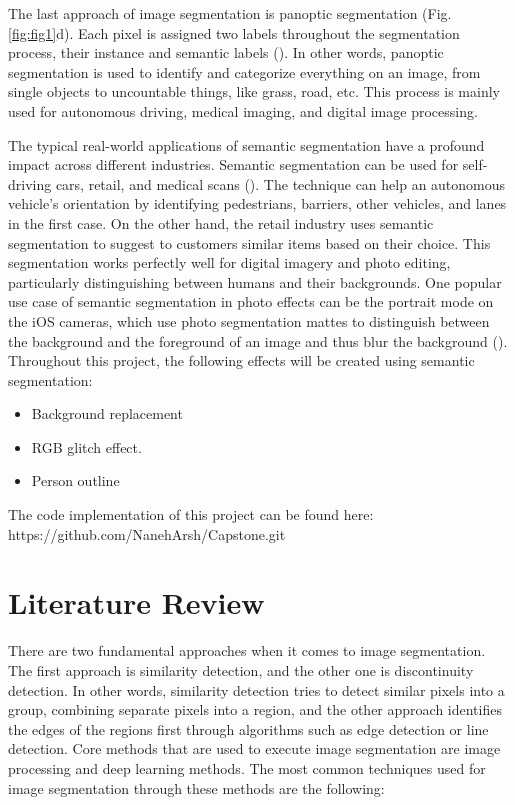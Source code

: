 \documentclass[english]{sbrt}
\begin{document}
The last approach of image segmentation is panoptic segmentation (Fig. \ref{fig:fig1}d). Each pixel is assigned two labels throughout the segmentation process, their instance and semantic labels (\cite{kirillov_2019_panoptic}). In other words, panoptic segmentation is used to identify and categorize everything on an image, from single objects to uncountable things, like grass, road, etc. This process is mainly used for autonomous driving, medical imaging, and digital image processing. 

\par The typical real-world applications of semantic segmentation have a profound impact across different industries. Semantic segmentation can be used for self-driving cars, retail, and medical scans (\cite{keymakr_2021_instance}). The technique can help an autonomous vehicle's orientation by identifying pedestrians, barriers, other vehicles, and lanes in the first case. On the other hand, the retail industry uses semantic segmentation to suggest to customers similar items based on their choice. This segmentation works perfectly well for digital imagery and photo editing, particularly distinguishing between humans and their backgrounds. One popular use case of semantic segmentation in photo effects can be the portrait mode on the iOS cameras, which use photo segmentation mattes to distinguish between the background and the foreground of an image and thus blur the background (\cite{appleinc_2019_advances}). Throughout this project, the following effects will be created using semantic segmentation: 
\begin{itemize}
    \item Background replacement
    \item RGB glitch effect.
    \item Person outline
\end{itemize}
The code implementation of this project can be found here:
https://github.com/NanehArsh/Capstone.git

\section{Literature Review}
There are two fundamental approaches when it comes to image segmentation. The first approach is similarity detection, and the other one is discontinuity detection. In other words, similarity detection tries to detect similar pixels into a group, combining separate pixels into a region, and the other approach identifies the edges of the regions first through algorithms such as edge detection or line detection. 
Core methods that are used to execute image segmentation are image processing and deep learning methods. The most common techniques used for image segmentation through these methods are the following:  
\end{document}

